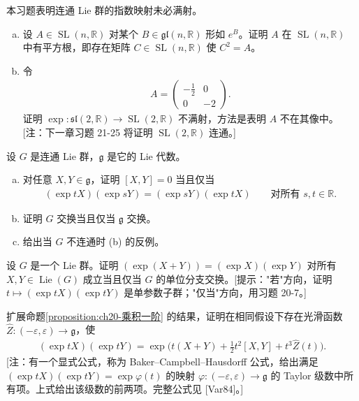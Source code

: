 \documentclass[../../main.tex]{subfiles}
\begin{document}
\begin{exercise}\label{exercise:ch20-06}
本习题表明连通 Lie 群的指数映射未必满射。
\begin{enumerate}[(a)]
\item 设 $A\in\operatorname{SL}(n,\mathbb{R})$ 对某个 $B\in\mathfrak{gl}(n,\mathbb{R})$ 形如 $e^B$。证明 $A$ 在 $\operatorname{SL}(n,\mathbb{R})$ 中有平方根，即存在矩阵 $C\in\operatorname{SL}(n,\mathbb{R})$ 使 $C^2=A$。
\item 令
\begin{align*}
A=\begin{pmatrix}-\tfrac12&0\\0&-2\end{pmatrix}.
\end{align*}
证明 $\exp\colon\mathfrak{sl}(2,\mathbb{R})\to\operatorname{SL}(2,\mathbb{R})$ 不满射，方法是表明 $A$ 不在其像中。[注：下一章习题 21-25 将证明 $\operatorname{SL}(2,\mathbb{R})$ 连通。]
\end{enumerate}
\end{exercise}

\begin{exercise}\label{exercise:ch20-07}
设 $G$ 是连通 Lie 群，$\mathfrak g$ 是它的 Lie 代数。
\begin{enumerate}[(a)]
\item 对任意 $X,Y\in\mathfrak g$，证明 $[X,Y]=0$ 当且仅当
\begin{align*}
(\exp tX)(\exp sY)=(\exp sY)(\exp tX)\qquad\text{对所有 }s,t\in\mathbb{R}.
\end{align*}
\item 证明 $G$ 交换当且仅当 $\mathfrak g$ 交换。
\item 给出当 $G$ 不连通时 (b) 的反例。
\end{enumerate}
\end{exercise}

\begin{exercise}\label{exercise:ch20-08}
设 $G$ 是一个 Lie 群。证明 $(\exp(X+Y))=(\exp X)(\exp Y)$ 对所有 $X,Y\in\operatorname{Lie}(G)$ 成立当且仅当 $G$ 的单位分支交换。[提示："若"方向，证明 $t\mapsto(\exp tX)(\exp tY)$ 是单参数子群；"仅当"方向，用习题 20-7。]
\end{exercise}

\begin{exercise}\label{exercise:ch20-09}
扩展命题\cref{proposition:ch20-乘积一阶} 的结果，证明在相同假设下存在光滑函数 $\widehat Z\colon(-\varepsilon,\varepsilon)\to\mathfrak g$，使
\begin{align*}
(\exp tX)(\exp tY)=\exp\bigl(t(X+Y)+\tfrac12t^2[X,Y]+t^3\widehat Z(t)\bigr).
\end{align*}
[注：有一个显式公式，称为 Baker--Campbell--Hausdorff 公式，给出满足 $(\exp tX)(\exp tY)=\exp\varphi(t)$ 的映射 $\varphi\colon(-\varepsilon,\varepsilon)\to\mathfrak g$ 的 Taylor 级数中所有项。上式给出该级数的前两项。完整公式见 [Var84]。]
\end{exercise}
\end{document}
